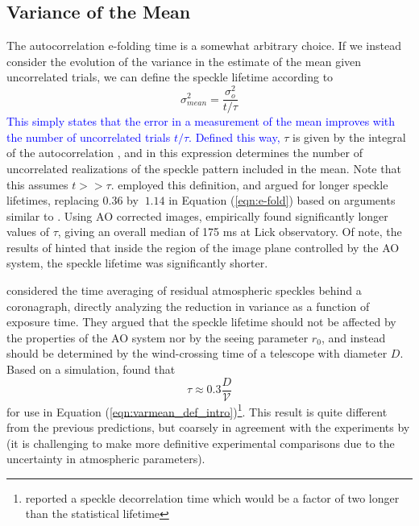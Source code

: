 \documentclass[10pt,preprint]{aastex631}
\newcommand{\jrmadd}[1]{\textcolor{blue}{#1}}
\begin{document}
\subsection{Variance of the Mean}
The autocorrelation e-folding time is a somewhat arbitrary choice.  If we instead consider the evolution of the variance in the estimate of the mean given uncorrelated trials, we can define the speckle lifetime according to
\begin{equation}
\sigma_{mean}^2 = \frac{\sigma_o^2}{t/\tau}
\label{eqn:varmean_def_intro}
\end{equation}
\jrmadd{This simply states that the error in a measurement of the mean improves with the number of uncorrelated trials $t/\tau$.  Defined this way,} $\tau$ is given by the integral of the autocorrelation \citep{2006ApJ...637..541F}, and in this expression determines the number of uncorrelated realizations of the speckle pattern included in the mean.  Note that this assumes $t >> \tau$.  \citet{1986JOSAA...3.1001A} employed this definition, and argued for longer speckle lifetimes, replacing $0.36$ by $~$$1.14$ in Equation (\ref{eqn:e-fold}) based on arguments similar to \citet{1982JOpt...13..263R}.  Using AO corrected images, \citet{2006ApJ...637..541F} empirically found significantly longer values of $\tau$, giving an overall median of 175 ms at Lick observatory.  Of note, the results of \citet{2006ApJ...637..541F} hinted that inside the region of the image plane controlled by the AO system, the speckle lifetime was significantly shorter.

\citet{2005SPIE.5903..170M} considered the time averaging of residual atmospheric speckles behind a coronagraph, directly analyzing the reduction in variance as a function of exposure time.  They argued that the speckle lifetime should not be affected by the properties of the AO system nor by the seeing parameter $r_0$, and instead should be determined by the wind-crossing time of a telescope with diameter $D$.  Based on a simulation, \citet{2005SPIE.5903..170M} found that 
\begin{equation}
\tau \approx 0.3 \frac{D}{\mathcal{V}}
\end{equation}
for use in Equation (\ref{eqn:varmean_def_intro})\footnote{\citet{2005SPIE.5903..170M} reported a speckle decorrelation time which would be a factor of two longer than the statistical lifetime}.  This result is quite different from the previous predictions, but coarsely in agreement with the experiments by \citet{2006ApJ...637..541F} (it is challenging to make more definitive experimental comparisons due to the uncertainty in atmospheric parameters).
\end{document}
